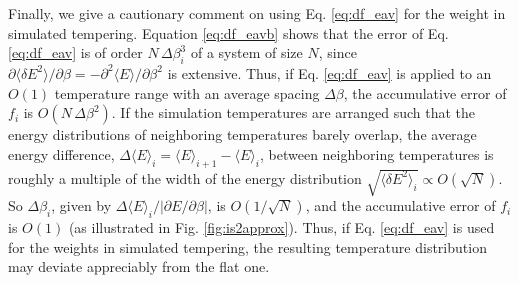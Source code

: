 \documentclass[reprint,aip,jcp,superscriptaddress]{revtex4-1}
\begin{document}
Finally, we give a cautionary comment
on using Eq. \eqref{eq:df_eav}
for the weight in simulated tempering\cite{park2007}.
%
Equation \eqref{eq:df_eavb} shows that
the error of Eq. \eqref{eq:df_eav}
is of order $N \, \Delta \beta_i^3$
of a system of size $N$,
since
$\partial \langle \delta E^2 \rangle / \partial \beta
= -\partial^2 \langle E \rangle / \partial \beta^2$
is extensive.
%
Thus,
if Eq. \eqref{eq:df_eav} is applied to
an $O(1)$ temperature range
with an average spacing $\Delta \beta$,
the accumulative error of $f_i$
is $O(N \, \Delta \beta^2)$.
%
If the simulation temperatures
are arranged
such that the energy distributions
of neighboring temperatures
barely overlap,
%
the average energy difference,
$\Delta \langle E \rangle_i = \langle E \rangle_{i+1} - \langle E \rangle_i$,
between neighboring temperatures
is roughly a multiple of the width of
the energy distribution
$\sqrt{ \langle \delta E^2 \rangle_i } \propto O(\sqrt{N})$.
%
So $\Delta \beta_i$,
given by $\Delta \langle E \rangle_i / |\partial E/\partial \beta|$,
is $O(1/\sqrt{N})$,
%
and the accumulative error
of $f_i$ is $O(1)$
(as illustrated in Fig. \ref{fig:is2approx}).
%
Thus, if Eq. \eqref{eq:df_eav}
is used for the weights
in simulated tempering\cite{park2007},
the resulting temperature distribution
may deviate appreciably
from the flat one.
%




\end{document}
